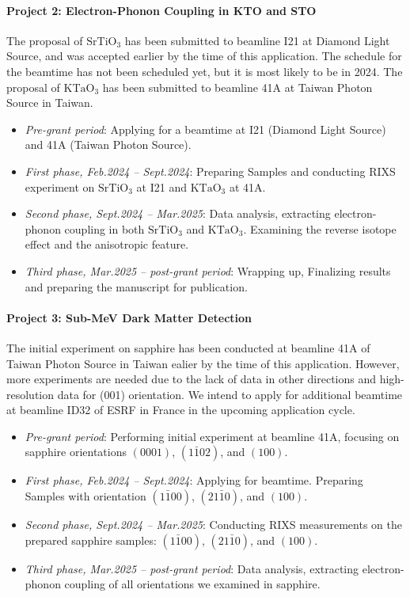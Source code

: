 \documentclass[11pt]{article}
\begin{document}
\paragraph{Project 2: Electron-Phonon Coupling in KTO and STO}
The proposal of $\mathrm{SrTiO_{3}}$ has been submitted to beamline I21 at Diamond Light Source, and was accepted earlier by the time of this application. The schedule for the beamtime has not been scheduled yet, but it is most likely to be in 2024. The proposal of $\mathrm{KTaO_{3}}$ has been submitted to beamline 41A at Taiwan Photon Source in Taiwan. 
\begin{itemize}
  \item \textit{Pre-grant period}: Applying for a beamtime at I21 (Diamond Light Source) and 41A (Taiwan Photon Source).
  \item \textit{First phase, Feb.2024 -- Sept.2024}: Preparing Samples and conducting RIXS experiment on $\mathrm{SrTiO_{3}}$ at I21 and $\mathrm{KTaO_{3}}$ at 41A. 
  \item \textit{Second phase, Sept.2024 -- Mar.2025}: Data analysis, extracting electron-phonon coupling in both $\mathrm{SrTiO_{3}}$ and $\mathrm{KTaO_{3}}$. Examining the reverse isotope effect and the anisotropic feature.
  \item \textit{Third phase, Mar.2025 -- post-grant period}:  Wrapping up,  Finalizing results and preparing the manuscript for publication.
\end{itemize}

\paragraph{Project 3: Sub-MeV Dark Matter Detection}
The initial experiment on sapphire has been conducted at beamline 41A of Taiwan Photon Source in Taiwan ealier by the time of this application. However, more experiments are needed due to the lack of data in other directions and high-resolution data for (001) orientation. We intend to apply for additional beamtime at beamline ID32 of ESRF in France in the upcoming application cycle.
\begin{itemize}
  \item \textit{Pre-grant period}: Performing initial experiment at beamline 41A, focusing on sapphire orientations $(0001)$, $(1\bar{1}02)$, and $(100)$. 
  \item \textit{First phase, Feb.2024 -- Sept.2024}: Applying for beamtime. Preparing Samples with orientation $(1\bar{1}00)$, $(21\bar{1}0)$, and $(100)$. 
  \item \textit{Second phase, Sept.2024 -- Mar.2025}: Conducting RIXS measurements on the prepared sapphire samples: $(1\bar{1}00)$, $(21\bar{1}0)$, and $(100)$. 
  \item \textit{Third phase, Mar.2025 -- post-grant period}: Data analysis, extracting electron-phonon coupling of all orientations we examined in sapphire.
\end{itemize}
\end{document}
